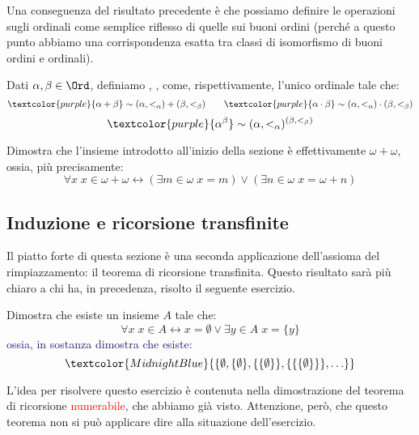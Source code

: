 \documentclass[11pt]{scrartcl}
\begin{document}
Una conseguenza del risultato precedente è che possiamo definire le operazioni sugli ordinali come semplice riflesso di quelle sui buoni ordini (perché a questo punto abbiamo una corrispondenza esatta tra classi di isomorfismo di buoni ordini e ordinali).

\begin{definition}
	Dati $\alpha,\beta \in\Ord$, definiamo \vocab{$\alpha + \beta$}, \vocab{$\alpha\cdot\beta$}, \vocab{$\alpha^\beta$} come, rispettivamente, l'unico ordinale tale che:
	\[ \textcolor{purple}{\alpha + \beta} \sim (\alpha,<_\alpha)+(\beta,<_\beta) \qquad \textcolor{purple}{\alpha \cdot \beta} \sim (\alpha,<_\alpha) \cdot (\beta,<_\beta)
		\]\[ \textcolor{purple}{\alpha^\beta} \sim (\alpha,<_\alpha)^{(\beta,<_\beta)}
			\]
\end{definition}

\begin{exercise}
	Dimostra che l'insieme introdotto all'inizio della sezione è effettivamente $\omega + \omega$, ossia, più precisamente:
	\[ \forall x \; x \in \omega + \omega \leftrightarrow (\exists m \in \omega \; x = m) \lor (\exists n \in \omega \; x = \omega +n)
		\]
\end{exercise}

\subsection{Induzione e ricorsione transfinite}
Il piatto forte di questa sezione è una seconda applicazione dell'assioma del rimpiazzamento: il teorema di ricorsione transfinita. Questo risultato sarà più chiaro a chi ha, in precedenza, risolto il seguente esercizio.

\begin{exercise}
	Dimostra che esiste un insieme $A$ tale che:
	\[ \forall x \; x \in A \leftrightarrow x = \emptyset \lor \exists y \in A \; x = \{y\}
		\]
	\textcolor{MidnightBlue}{ossia, in sostanza dimostra che esiste:}
	\[ \textcolor{MidnightBlue}{\{\emptyset,\{\emptyset\},\{\{\emptyset\}\},\{\{\{\emptyset\}\}\},\ldots\}}
		\]
\end{exercise}

L'idea per risolvere questo esercizio è contenuta nella dimostrazione del teorema di ricorsione \textcolor{red}{numerabile}, che abbiamo già visto. Attenzione, però,
che questo teorema non si può applicare dire alla situazione dell'esercizio.

\begin{soln}
	
\end{soln}
\end{document}
